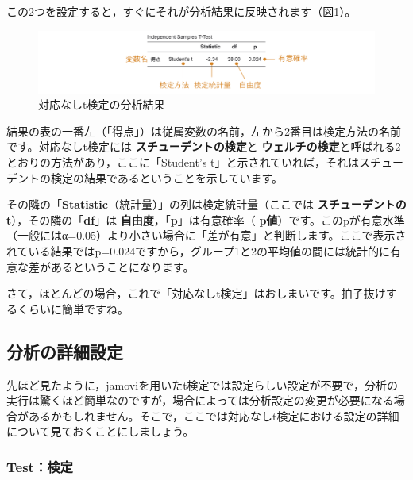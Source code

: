 \documentclass[
  12pt,
  a5jpaper,
  lualatex, ja=standard]{bxjsbook}
\renewcommand{\emph}[1]{\textbf{\color{emph} #1}}
\begin{document}
この2つを設定すると，すぐにそれが分析結果に反映されます（図\ref{fig:ttests-t-results}）。

\begin{figure}[!ht]

{\centering \includegraphics[width=1\linewidth]{images/ttests/t-resutls} 

}

\caption{対応なしt検定の分析結果}\label{fig:ttests-t-results}
\end{figure}

結果の表の一番左（「得点」）は従属変数の名前，左から2番目は検定方法の名前です。対応なしt検定には\emph{スチューデントの検定}と\emph{ウェルチの検定}と呼ばれる2とおりの方法があり，ここに「Student's t」と示されていれば，それはスチューデントの検定の結果であるということを示しています。

その隣の「\textbf{Statistic}（統計量）」の列は検定統計量（ここでは\emph{スチューデントのt}），その隣の「\textbf{df}」は\emph{自由度}，「\textbf{p}」は有意確率（\emph{p値}）です。このpが有意水準（一般にはα=0.05）より小さい場合に「差が有意」と判断します。ここで表示されている結果ではp=0.024ですから，グループ1と2の平均値の間には統計的に有意な差があるということになります。

さて，ほとんどの場合，これで「対応なしt検定」はおしまいです。拍子抜けするくらいに簡単ですね。

\hypertarget{sub:ttest-setting2}{%
\subsection{分析の詳細設定}\label{sub:ttest-setting2}}

先ほど見たように，jamoviを用いたt検定では設定らしい設定が不要で，分析の実行は驚くほど簡単なのですが，場合によっては分析設定の変更が必要になる場合があるかもしれません。そこで，ここでは対応なしt検定における設定の詳細について見ておくことにしましょう。

\hypertarget{subsub:ttest-test2}{%
\subsubsection*{Test：検定}\label{subsub:ttest-test2}}
\end{document}
